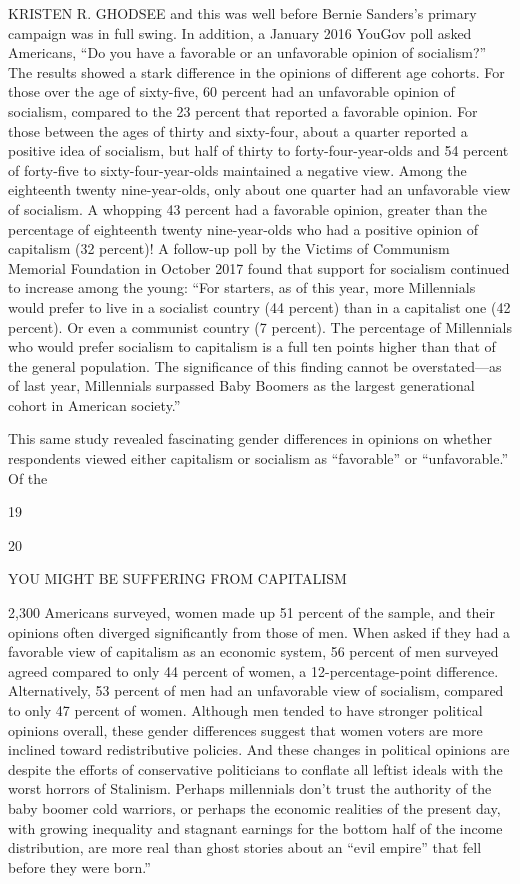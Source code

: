 KRISTEN R. GHODSEE and this was well before Bernie Sanders’s primary campaign was in full swing. In addition, a January 2016 YouGov poll asked Americans, “Do you have a favorable or an unfavorable opinion of socialism?” The results showed a stark difference in the opinions of different age cohorts. For those over the age of sixty-five, {\color{blue}60} percent had an unfavorable opinion of socialism, compared to the {\color{blue}23} percent that reported a favorable opinion. For those between the ages of thirty and sixty-four, about a quarter reported a positive idea of socialism, but half of thirty to forty-four-year-olds and {\color{blue}54} percent of forty-five to sixty-four-year-olds maintained a negative view. Among the eighteenth twenty nine-year-olds, only about one quarter had an unfavorable view of socialism. A whopping {\color{blue}43} percent had a favorable opinion, greater than the percentage of eighteenth twenty nine-year-olds who had a positive opinion of capitalism (32 percent)! A follow-up poll by the Victims of Communism Memorial Foundation in October 2017 found that support for socialism continued to increase among the young: “For starters, as of this year, more Millennials would prefer to live in a socialist country (44 percent) than in a capitalist one (42 percent). Or even a communist country (7 percent). The percentage of Millennials who would prefer socialism to capitalism is a full ten points higher than that of the general population. The significance of this finding cannot be overstated—as of last year, Millennials surpassed Baby Boomers as the largest generational cohort in American society.”
 \par 
This same study revealed fascinating gender differences in opinions on whether respondents viewed either capitalism or socialism as “favorable” or “unfavorable.” Of the
 \par 
19
 \par 
20
 \par 
YOU MIGHT BE SUFFERING FROM CAPITALISM
 \par 
2,300 Americans surveyed, women made up {\color{blue}51} percent of the sample, and their opinions often diverged significantly from those of men. When asked if they had a favorable view of capitalism as an economic system, {\color{blue}56} percent of men surveyed agreed compared to only {\color{blue}44} percent of women, a 12-percentage-point difference. Alternatively, {\color{blue}53} percent of men had an unfavorable view of socialism, compared to only {\color{blue}47} percent of women. Although men tended to have stronger political opinions overall, these gender differences suggest that women voters are more inclined toward redistributive policies. And these changes in political opinions are despite the efforts of conservative politicians to conflate all leftist ideals with the worst horrors of Stalinism. Perhaps millennials don’t trust the authority of the baby boomer cold warriors, or perhaps the economic realities of the present day, with growing inequality and stagnant earnings for the bottom half of the income distribution, are more real than ghost stories about an “evil empire” that fell before they were born.”
